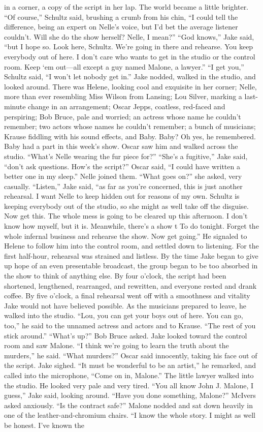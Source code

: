 \documentclass{novel}
\begin{document}
in a corner, a copy of the script in her lap. The world became a little brighter. “Of course,” Schultz said, brushing a crumb from his chin, “I could tell the difference, being an expert on Nelle’s voice, but I’d bet the average listener couldn’t. Will she do the show herself? Nelle, I mean?” “God knows,” Jake said, “but I hope so. Look here, Schultz. We’re going in there and rehearse. You keep everybody out of here. I don’t care who wants to get in the studio or the control room. Keep ‘em out—all except a guy named Malone, a lawyer.” “I get you,” Schultz said, “I won’t let nobody get in.” Jake nodded, walked in the studio, and looked around. There was Helene, looking cool and exquisite in her corner; Nelle, more than ever resembling Miss Wilson from Lansing; Lou Silver, marking a last-minute change in an arrangement; Oscar Jepps, coatless, red-faced and perspiring; Bob Bruce, pale and worried; an actress whose name he couldn’t remember; two actors whose names he couldn’t remember; a bunch of musicians; Krause fiddling with his sound effects, and Baby. Baby? Oh yes, he remembered. Baby had a part in this week’s show. Oscar saw him and walked across the studio. “What’s Nelle wearing the fur piece for?” “She’s a fugitive,” Jake said, “don’t ask questions. How’s the script?” Oscar said, “I could have written a better one in my sleep.” Nelle joined them. “What goes on?” she asked, very casually. “Listen,” Jake said, “as far as you’re concerned, this is just another rehearsal. I want Nelle to keep hidden out for reasons of my own. Schultz is keeping everybody out of the studio, so she might as well take off the disguise. Now get this. The whole mess is going to be cleared up this afternoon. I don’t know how myself, but it is. Meanwhile, there’s a show t To do tonight. Forget the whole infernal business and rehearse the show. Now get going.” He signaled to Helene to follow him into the control room, and settled down to listening. For the first half-hour, rehearsal was strained and listless. By the time Jake began to give up hope of an even presentable broadcast, the group began to be too absorbed in the show to think of anything else. By four o’clock, the script had been shortened, lengthened, rearranged, and rewritten, and everyone rested and drank coffee. By five o’clock, a final rehearsal went off with a smoothness and vitality Jake would not have believed possible. As the musicians prepared to leave, he walked into the studio. “Lou, you can get your boys out of here. You can go, too,” he said to the unnamed actress and actors and to Krause. “The rest of you stick around.” “What’s up?” Bob Bruce asked. Jake looked toward the control room and saw Malone. “I think we’re going to learn the truth about the murders,” he said. “What murders?” Oscar said innocently, taking his face out of the script. Jake sighed. “It must be wonderful to be an artist,” he remarked, and called into the microphone, “Come on in, Malone.” The little lawyer walked into the studio. He looked very pale and very tired. “You all know John J. Malone, I guess,” Jake said, looking around. “Have you done something, Malone?” McIvers asked anxiously. “Is the contract safe?” Malone nodded and sat down heavily in one of the leather-and-chromium chairs. “I know the whole story. I might as well be honest. I've known the 
\end{document}
